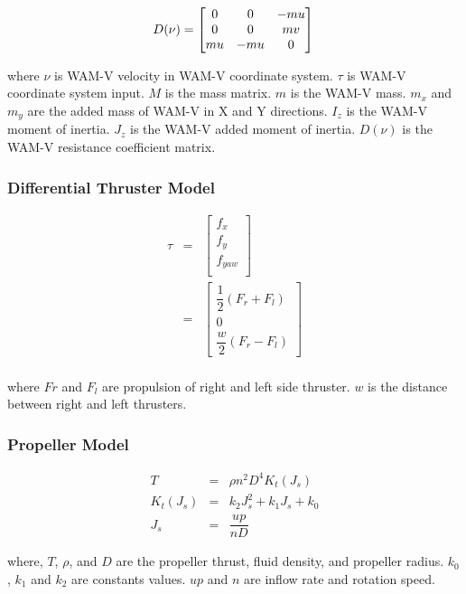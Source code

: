 \documentclass[lettersize,journal]{IEEEtran}
\begin{document}
\begin{equation}
D(\nu) = 
\begin{bmatrix}
0 & 0 & -mu \\
0 & 0 & mv \\
mu & -mu & 0
\end{bmatrix}\\
\end{equation}

where $\nu$ is WAM-V velocity in WAM-V coordinate system.
$\tau$ is WAM-V coordinate system input.
$M$ is the mass matrix.
$m$ is the WAM-V mass.
$m_x$ and $m_y$ are the added mass of WAM-V in X and Y directions.
$I_z$ is the WAM-V moment of inertia.
$J_z$ is the WAM-V added moment of inertia.
$D(\nu)$ is the WAM-V resistance coefficient matrix.

\subsubsection{Differential Thruster Model}
\begin{eqnarray}
\tau &=& 
\begin{bmatrix}
f_x \\ 
f_y \\
f_{yaw} \\
\end{bmatrix}\nonumber  \\
&=&
\begin{bmatrix}
\dfrac{1}{2}(F_r + F_l) \\
0 \\
\dfrac{w}{2}(F_r - F_l) 
\end{bmatrix} \\
\nonumber  
\end{eqnarray}

where $Fr$ and $F_l$ are propulsion of right and left side thruster.
$w$ is the distance between right and left thrusters.


\subsubsection{Propeller Model}
\begin{eqnarray}
T &=& \rho n^2 D^4 K_t(J_s)\\
K_t(J_s) &=& k_2J_s^2 + k_1J_s + k_0\\
J_s &=& \dfrac{up}{nD}
\end{eqnarray}

where,
$T$, $\rho$, and $D$ are the propeller thrust, fluid density, and propeller radius.
$k_0$, $k_1$ and $k_2$ are constants values.
$up$ and $n$ are inflow rate and rotation speed.
\end{document}
